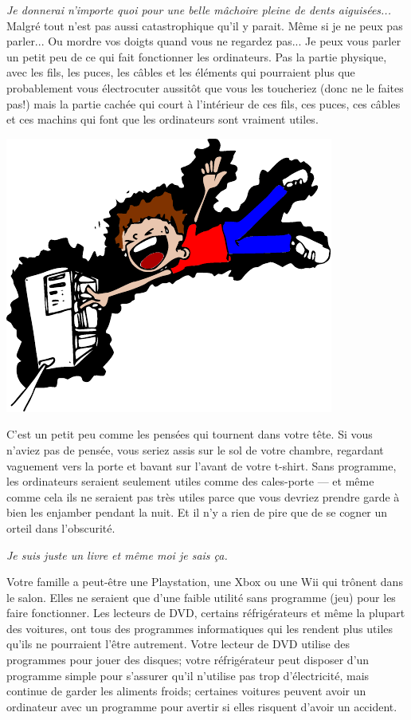 \emph{Je donnerai n'importe quoi pour une belle mâchoire pleine de dents aiguisées...}\\


Malgré tout n'est pas aussi catastrophique qu'il y parait. Même si je ne peux pas parler... Ou mordre vos doigts quand vous ne regardez pas... Je peux vous parler un petit peu de ce qui fait fonctionner les ordinateurs. Pas la partie physique, avec les fils, les puces, les câbles et les éléments qui pourraient plus que probablement vous électrocuter aussitôt que vous les toucheriez (donc ne le faites pas!) mais la partie cachée qui court à l'intérieur de ces fils, ces puces, ces câbles et ces machins qui font que les ordinateurs sont vraiment utiles. 

\begin{center}
\includegraphics[scale=1]{images/electrocution.pdf} 
\end{center} 

C'est un petit peu comme les pensées qui tournent dans votre tête. Si vous n'aviez pas de pensée, vous seriez assis sur le sol de votre chambre, regardant vaguement vers la porte et bavant sur l'avant de votre t-shirt. Sans programme, les ordinateurs seraient seulement utiles comme des cales-porte --- et même comme cela ils ne seraient pas très utiles parce que vous devriez prendre garde à bien les enjamber pendant la nuit. Et il n'y a rien de pire que de se cogner un orteil dans l'obscurité.

\bigskip
\emph {Je suis juste un livre et même moi je sais ça.}

\bigskip
Votre famille a peut-être une Playstation, une Xbox ou une Wii qui trônent dans le salon. Elles ne seraient que d'une faible utilité sans programme (jeu) pour les faire fonctionner. Les lecteurs de DVD, certains réfrigérateurs et même la plupart des voitures, ont tous des programmes informatiques qui les rendent plus utiles qu'ils ne pourraient l'être autrement. Votre lecteur de DVD utilise des programmes pour jouer des disques; votre réfrigérateur peut disposer d'un programme simple pour s'assurer qu'il n'utilise pas trop d'électricité, mais continue de garder les aliments froids; certaines voitures peuvent avoir un ordinateur avec un programme pour avertir si elles risquent d'avoir un accident.

